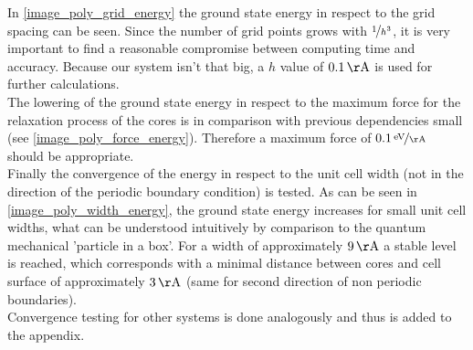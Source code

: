 In \cref{image_poly_grid_energy} the ground state energy in respect to the grid spacing can be seen. Since the number of grid points grows with $\nicefrac{1}{h^3}$, it is very important to find a reasonable compromise between computing time and accuracy. Because our system isn't that big, a $h$ value of $\unit[0.1]{\AA}$ is used for further calculations.\\
The lowering of the ground state energy in respect to the maximum force for the relaxation process of the cores is in comparison with previous dependencies small (see \cref{image_poly_force_energy}). Therefore a maximum force of $\unitfrac[0.1]{eV}{\AA}$ should be appropriate.\\
Finally the convergence of the energy in respect to the unit cell width (not in the direction of the periodic boundary condition) is tested. As can be seen in \cref{image_poly_width_energy}, the ground state energy increases for small unit cell widths, what can be understood intuitively by comparison to the quantum mechanical 'particle in a box'. For a width of approximately $\unit[9]{\AA}$ a stable level is reached, which corresponds with a minimal distance between cores and cell surface of approximately $\unit[3]{\AA}$ (same for second direction of non periodic boundaries).\\
Convergence testing for other systems is done analogously and thus is added to the appendix.

